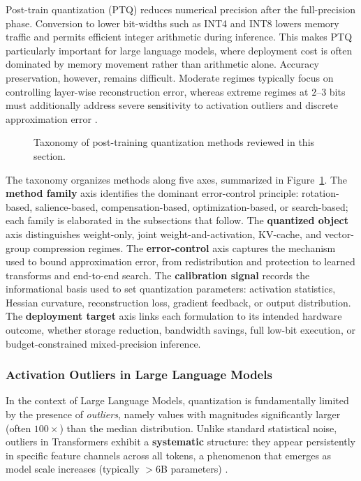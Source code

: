 Post-train quantization (PTQ) reduces numerical precision after the full-precision phase. Conversion to lower bit-widths such as INT4 and INT8 lowers memory traffic and permits efficient integer arithmetic during inference. This makes PTQ particularly important for large language models, where deployment cost is often dominated by memory movement rather than arithmetic alone. Accuracy preservation, however, remains difficult. Moderate regimes typically focus on controlling layer-wise reconstruction error, whereas extreme regimes at $2$--$3$ bits must additionally address severe sensitivity to activation outliers and discrete approximation error \cite{frantar2022gptq,chee2024quip,ashkboos2024quarot}.

\begin{figure}[htbp]
  \centering
  \makebox[\textwidth][c]{%
  }
  \caption[Taxonomy of post-training quantization methods]{Taxonomy of post-training quantization methods reviewed in this section.}
  \label{fig:type_of_ptq}
\end{figure}

The taxonomy organizes methods along five axes, summarized in Figure~\ref{fig:type_of_ptq}. The \textbf{method family} axis identifies the dominant error-control principle: rotation-based, salience-based, compensation-based, optimization-based, or search-based; each family is elaborated in the subsections that follow. The \textbf{quantized object} axis distinguishes weight-only, joint weight-and-activation, KV-cache, and vector-group compression regimes. The \textbf{error-control} axis captures the mechanism used to bound approximation error, from redistribution and protection to learned transforms and end-to-end search. The \textbf{calibration signal} records the informational basis used to set quantization parameters: activation statistics, Hessian curvature, reconstruction loss, gradient feedback, or output distribution. The \textbf{deployment target} axis links each formulation to its intended hardware outcome, whether storage reduction, bandwidth savings, full low-bit execution, or budget-constrained mixed-precision inference.


\subsubsection{Activation Outliers in Large Language Models}
\label{subsec:activation_outliers}
In the context of Large Language Models, quantization is fundamentally limited by the presence of \textit{outliers}, namely values with magnitudes significantly larger (often $100\times$) than the median distribution. Unlike standard statistical noise, outliers in Transformers exhibit a \textbf{systematic} structure: they appear persistently in specific feature channels across all tokens, a phenomenon that emerges as model scale increases (typically $>6$B parameters) \cite{dettmers2022llmint8}.

